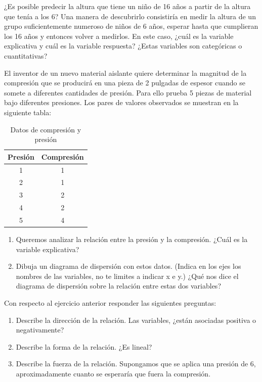 \documentclass[11pt,evaluacion]{uescimat}
\begin{document}
\begin{problema}
¿Es posible predecir la altura que tiene un niño de 16 años a partir de la altura que tenía a los 6? Una manera de descubrirlo consistiría en medir la altura
de un grupo suficientemente numeroso de niños de 6 años, esperar hasta que
cumplieran los 16 años y entonces volver a medirlos. En este caso, ¿cuál es la variable explicativa y cuál es la variable respuesta? ¿Estas variables son categóricas
o cuantitativas?
\end{problema}

\begin{problema}
El inventor de un nuevo material aislante quiere determinar
la magnitud de la compresión que se producirá en una pieza de 2 pulgadas
de espesor cuando se somete a diferentes cantidades de presión. Para ello
prueba 5 piezas de material bajo diferentes presiones. Los pares de valores
observados se muestran en la siguiente tabla:


\begin{table}[H]
\begin{centering}
\begin{tabular}{|c|c|}
\hline 
Presión & Compresión\tabularnewline
\hline 
\hline 
1 & 1\tabularnewline
\hline 
2 & 1\tabularnewline
\hline 
3 & 2\tabularnewline
\hline 
4 & 2\tabularnewline
\hline 
5 & 4\tabularnewline
\hline 
\end{tabular}
\par\end{centering}
\caption{Datos de compresión y presión}
\end{table}

\begin{enumerate}[label=(\alph*)]
\item Queremos analizar la relación entre la presión y la compresión. ¿Cuál es la variable explicativa?
\item Dibuja un diagrama de dispersión con estos datos. (Indica en los ejes los
nombres de las variables, no te limites a indicar x e y.) ¿Qué nos dice el diagrama
de dispersión sobre la relación entre estas dos variables?
\end{enumerate}


\end{problema}

\begin{problema}
Con respecto al ejercicio anterior responder las siguientes preguntas: 

\begin{enumerate}[label=(\alph*)]
\item Describe la dirección de la relación. Las variables, ¿están asociadas positiva o negativamente?

\item Describe la forma de la relación. ¿Es lineal?

\item Describe la fuerza de la relación. Supongamos que se aplica una presión de 6, aproximadamente cuanto se esperaría que fuera la compresión. 


\end{enumerate}


\end{problema}
\end{document}
